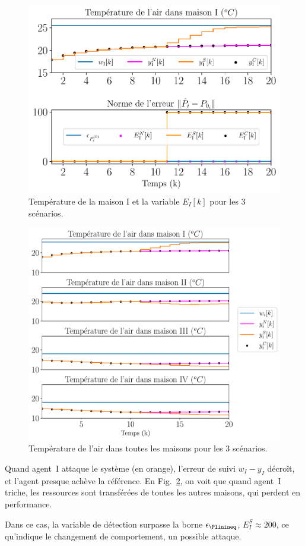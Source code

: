 \documentclass[../main.tex]{subfiles}
\begin{document}
\begin{figure}[h]
  \centering
 \includegraphics[width=.7\textwidth,trim=0 .3cm 0 .2cm,clip]{../img/resilient_ineq/ErrorWX_command_normErrH_fr.pdf}
  \caption{Température de la maison I et la variable $E_{I}[k]$ pour les 3 scénarios.}\label{fig:response3Scenarios_fr}
\end{figure}
\begin{figure}[h]
  \centering
 \includegraphics[width=.7\textwidth,trim=0 .3cm 0 .2cm,clip]{../img/resilient_ineq/ErrorWX_command_normErrH_all_houses_fr.pdf}
  \caption{Température de l'air dans toutes les maisons pour les 3 scénarios.}\label{fig:response3Scenarios_all_houses_fr}
\end{figure}

Quand agent~I attaque le système (en orange), l'erreur de suivi
${w_{I}-y_{I}}$ décroît, et l'agent presque achève la référence.
En Fig.~\ref{fig:response3Scenarios_all_houses_fr}, on voit que quand agent~I triche, les ressources sont transférées de toutes les autres maisons, qui perdent en performance.

Dans ce cas, la variable de détection surpasse la borne $\epsilon_{\Plinineq}$,
${E_{I}^{S}\approx200}$, ce qu'indique le changement de comportement, un possible attaque.
\end{document}

